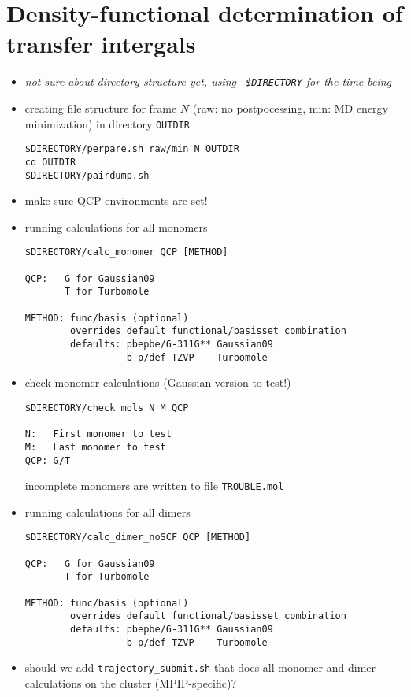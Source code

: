 \section{Density-functional determination of transfer intergals}
\label{sec:dft}

\begin{itemize}
\item {\it not sure about directory structure yet, using {\tt
      \$DIRECTORY} for the time being}
\item creating file structure for frame $N$ (raw: no postpocessing,
  min: MD energy minimization) in directory {\tt OUTDIR}
\begin{verbatim}
$DIRECTORY/perpare.sh raw/min N OUTDIR
cd OUTDIR
$DIRECTORY/pairdump.sh
\end{verbatim}
\item make sure QCP environments are set!
\item running calculations for all monomers
 \begin{verbatim}
$DIRECTORY/calc_monomer QCP [METHOD]

QCP:   G for Gaussian09
       T for Turbomole

METHOD: func/basis (optional)
        overrides default functional/basisset combination
        defaults: pbepbe/6-311G** Gaussian09
                  b-p/def-TZVP    Turbomole
\end{verbatim}
\item check monomer calculations (Gaussian version to test!) 
\begin{verbatim}
$DIRECTORY/check_mols N M QCP

N:   First monomer to test
M:   Last monomer to test
QCP: G/T 
\end{verbatim}
incomplete monomers are written to file {\tt TROUBLE.mol}
\item running calculations for all dimers
 \begin{verbatim}
$DIRECTORY/calc_dimer_noSCF QCP [METHOD]

QCP:   G for Gaussian09
       T for Turbomole

METHOD: func/basis (optional)
        overrides default functional/basisset combination
        defaults: pbepbe/6-311G** Gaussian09
                  b-p/def-TZVP    Turbomole
\end{verbatim}
\item should we add {\tt trajectory\_submit.sh} that does all monomer
  and dimer calculations on the cluster (MPIP-specific)?
\end{itemize}
